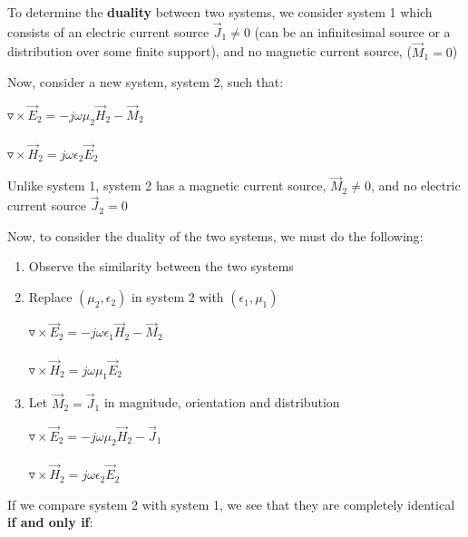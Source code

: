 \documentclass{article}
\begin{document}
To determine the \textbf{duality} between two systems, we consider system 1 which consists of an electric current source $\Vec{J}_1 \ne 0$ (can be an infinitesimal source or a distribution over some finite support), and no magnetic current source, ($\Vec{M}_1 = 0$)

Now, consider a new system, system 2, such that:

\begin{center}
    $\triangledown \times \Vec{E}_2 = -j \omega \mu_2 \Vec{H}_2 - \Vec{M}_2$ \\ 
    \hspace{0.1} \\
    $\triangledown \times \Vec{H}_2 = j \omega \epsilon_2 \Vec{E}_2$ \\ 
\end{center}

Unlike system 1, system 2 has a magnetic current source, $\Vec{M}_2 \ne 0$, and no electric current source $\Vec{J}_2 = 0$

Now, to consider the duality of the two systems, we must do the following:

\begin{enumerate}
    \item Observe the similarity between the two systems
    \item Replace $(\mu_2, \epsilon_2)$ in system 2 with $(\epsilon_1, \mu_1)$ 
    \begin{center}
    $\triangledown \times \Vec{E}_2 = -j \omega \epsilon_1 \Vec{H}_2 - \Vec{M}_2$ \\ 
    \hspace{0.1} \\
    $\triangledown \times \Vec{H}_2 = j \omega \mu_1 \Vec{E}_2$\\ 
\end{center}
    \item Let $\Vec{M}_2 = \Vec{J}_1$ in magnitude, orientation and distribution
    \begin{center}
    $\triangledown \times \Vec{E}_2 = -j \omega \mu_2 \Vec{H}_2 - \Vec{J}_1$ \\ 
    \hspace{0.1} \\
    $\triangledown \times \Vec{H}_2 = j \omega \epsilon_2 \Vec{E}_2$ \\ 
\end{center}
\end{enumerate}

If we compare system 2 with system 1, we see that they are completely identical \textbf{if and only if}:
\end{document}

